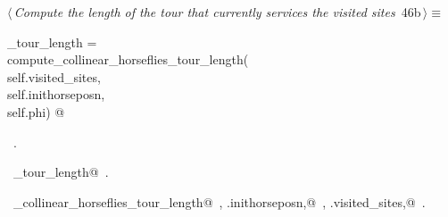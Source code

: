 \documentclass[11.5pt]{report}
\begin{document}
\vspace{-0.8cm}\newchunk 

\begin{flushleft} \small\label{scrap69}\raggedright\small
{} $\langle\,${\itshape Compute the length of the tour that currently services the visited sites}\nobreak\ {\footnotesize {46b}}$\,\rangle\equiv$
\vspace{-1ex}
\begin{list}{}{} \item
\mbox{}\verb@current_tour_length    = \@\\
\mbox{}\verb@         compute_collinear_horseflies_tour_length(\@\\
\mbox{}\verb@                    self.visited_sites,\@\\
\mbox{}\verb@                    self.inithorseposn,\@\\
\mbox{}\verb@                    self.phi) @\\
\mbox{}\verb@@{\NWsep}
\end{list}
\vspace{-1.5ex}
\footnotesize
\begin{list}{}{\setlength{\itemsep}{-\parsep}\setlength{\itemindent}{-\leftmargin}}
\item \NWtxtMacroRefIn\ .
\item \NWtxtIdentsDefed\nobreak\  \verb@current_tour_length@\nobreak\ .\item \NWtxtIdentsUsed\nobreak\  \verb@compute_collinear_horseflies_tour_length@\nobreak\ , \verb@self.inithorseposn,@\nobreak\ , \verb@self.visited_sites,@\nobreak\ .
\item{}
\end{list}
\vspace{4ex}
\end{flushleft}

\vspace{-0.8cm}\newchunk 
\end{document}
